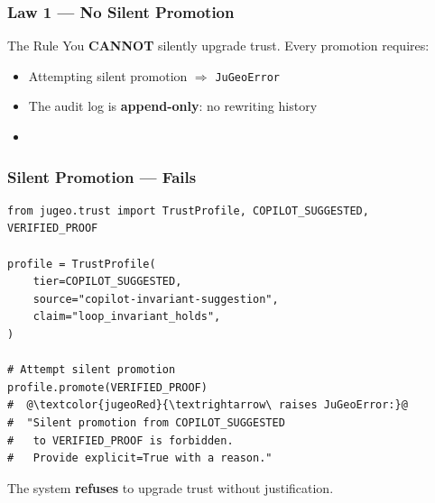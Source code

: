 \begin{frame}
\frametitle{Law 1 --- No Silent Promotion}
\begin{alertblock}{The Rule}
You \textbf{CANNOT} silently upgrade trust.  Every promotion requires:
\end{alertblock}
\vspace{0.3cm}
\begin{center}
\end{center}
\vfill
\begin{itemize}
  \item Attempting silent promotion $\Rightarrow$ \textcolor{jugeoRed}{\texttt{JuGeoError}}
  \item The audit log is \textbf{append-only}: no rewriting history
  \item {}
\end{itemize}
\end{frame}

\begin{frame}[fragile]
\frametitle{Silent Promotion --- Fails}
\begin{lstlisting}[escapechar=@]
from jugeo.trust import TrustProfile, COPILOT_SUGGESTED, VERIFIED_PROOF

profile = TrustProfile(
    tier=COPILOT_SUGGESTED,
    source="copilot-invariant-suggestion",
    claim="loop_invariant_holds",
)

# Attempt silent promotion
profile.promote(VERIFIED_PROOF)
#  @\textcolor{jugeoRed}{\textrightarrow\ raises JuGeoError:}@
#  "Silent promotion from COPILOT_SUGGESTED
#   to VERIFIED_PROOF is forbidden.
#   Provide explicit=True with a reason."
\end{lstlisting}
\vfill
\begin{center}
\small The system \textbf{refuses} to upgrade trust without justification.\\
\end{center}
\end{frame}


